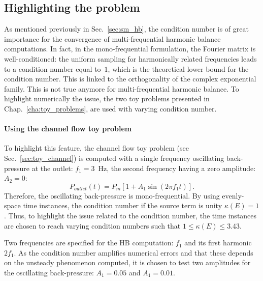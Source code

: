 
\subsection{Highlighting the problem}
As mentioned previously in Sec.~\ref{sec:sm_hb}, 
the condition number is of great importance
for the convergence of multi-frequential harmonic balance computations. 
In fact, in the mono-frequential formulation, 
the Fourier matrix is well-conditioned: the
uniform sampling for harmonically related frequencies leads to a
condition number equal to~$1$, which is the theoretical lower bound
for the condition number.  This is linked to the orthogonality of the
complex exponential family. This is not true anymore for multi-frequential
harmonic balance. To highlight numerically the issue, the two toy problems
presented in Chap.~\ref{cha:toy_problems},
are used with varying condition number.

\paragraph{Using the channel flow toy problem}
To highlight this feature, the channel flow toy problem
(see Sec.~\ref{sec:toy_channel}) is computed with a single
frequency oscillating back-pressure 
at the outlet: $f_1 = 3$~Hz, the second
frequency having a zero amplitude: $A_2= 0$:
\begin{equation}
   P_{outlet} (t) = P_m \left[ 1 + A_1 \sin \left(2 \pi f_1 t\right) \right].
\end{equation}
Therefore, the oscillating back-pressure is mono-frequential.
By using evenly-space time instances, the condition
number if the source term is unity $\kappa (E) = 1$. 
Thus, to highlight the issue related to the condition number,
the time instances are chosen to reach varying condition numbers
such that $1 \leq \kappa (E) \leq 3.43$.  

Two frequencies are
specified for the HB computation: $f_1$ and its first harmonic
$2f_1$. 
As the condition number amplifies numerical errors and that these
depends on the unsteady phenomenon computed, it is chosen to
test two amplitudes for the oscillating back-pressure: $A_1 = 0.05$
and $A_1=0.01$.

